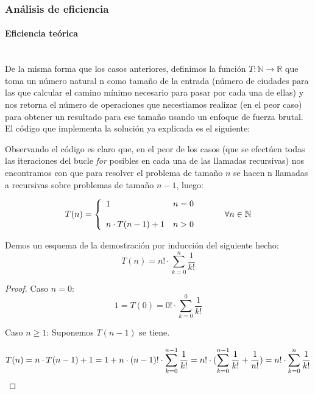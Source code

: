 \documentclass{article}
\newcommand{\myparagraph}[1]{\paragraph{#1}\mbox{}\\}
\newcommand\N{\ensuremath{\mathbb N}\space}
\begin{document}
\subsubsection{Análisis de eficiencia} %
\myparagraph{Eficiencia teórica}
De la misma forma que los casos anteriores, definimos la función $T:\mathbb{N} \to \mathbb{R} $ que toma un número natural n como tamaño 
de la entrada (número de ciudades para las que calcular el camino mínimo necesario para pasar por cada una de ellas) y nos retorna 
el número de operaciones que necestiamos realizar (en el peor caso) para obtener un resultado para ese tamaño usando un enfoque de fuerza brutal. El código que implementa la solución ya explicada es el siguiente:




Observando el código es claro que, en el peor de los casos
(que se efectúen todas las iteraciones del bucle \textit{for} posibles en cada una de las llamadas recursivas) nos encontramos con
que para resolver el problema de tamaño $n$ se hacen n llamadas 
a recursivas sobre problemas de tamaño $n-1$, luego:

\begin{equation} 
T(n) = \left\{ \begin{array}{lcc} 1 & n = 0  \\ \\ 
n\cdot T(n-1) + 1 &  n > 0 \\ \end{array} \right. \hspace{10mm} \forall n \in \N
\end{equation}

Demos un esquema de la demostración por inducción del siguiente
hecho:
\[
T(n) = n!\cdot \sum_{k=0}^{n} \frac{1}{k!}
\] 

\begin{proof}
Caso $n=0$:
\[
1 = T(0) = 0! \cdot \sum_{k=0}^{0} \frac{1}{k!}
\] 

Caso $n\ge 1$: Suponemos $T(n-1)$ se tiene.\newline


\[
T(n) = n \cdot T(n-1) + 1 = 1 +  n\cdot(n-1)!\cdot \sum_{k=0}^{n-1} \frac{1}{k!} \\
= n!  \cdot (\sum_{k=0}^{n-1} \frac{1}{k!} + \frac{1}{n!} )\\
= n!\cdot \sum_{k=0}^{n} \frac{1}{k!} \\
\] 
\end{proof}
\end{document}
